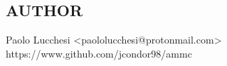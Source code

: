\subsection*{AUTHOR}
Paolo Lucchesi <paololucchesi@protonmail.com> \\
https://www.github.com/jcondor98/ammc
